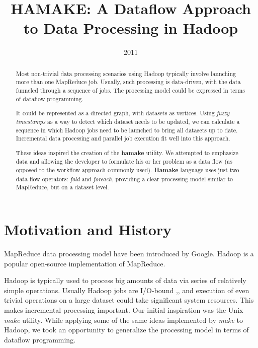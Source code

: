 \documentclass[10pt,conference,letterpaper]{IEEEtran}
\title{HAMAKE: A Dataflow Approach to Data Processing in Hadoop}
\author{\IEEEauthorblockN{Vadim Zaliva}
\IEEEauthorblockA{Codeminders\\
Email: lord@crocodile.org} \and \IEEEauthorblockN{Vladimir Orlov}
\IEEEauthorblockA{Codeminders\\
Email: vorl@codeminders.com}}
\date{2011}
\begin{document}
\lstset{language=XML,basicstyle=\tiny,markfirstintag=true,numbers=left,numbersep=1pt}

\maketitle

\begin{abstract}
  Most non-trivial data processing scenarios using Hadoop typically
  involve launching more than one MapReduce job. Usually, such
  processing is data-driven, with the data funneled through a sequence
  of jobs. The processing model could be expressed in terms of
  dataflow programming.
  
  It could be represented as a directed graph, with datasets as
  vertices. Using \textit{fuzzy timestamps} as a way to detect which
  dataset needs to be updated, we can calculate a sequence in which
  Hadoop jobs need to be launched to bring all datasets up to
  date. Incremental data processing and parallel job execution fit
  well into this approach.

  These ideas inspired the creation of the \textbf{hamake} utility. We
  attempted to emphasize data and allowing the developer to formulate
  his or her problem as a data flow (as opposed to the workflow approach
  commonly used). \textbf{Hamake} language uses just two data flow
  operators: \emph{fold} and \emph{foreach}, providing a clear
  processing model similar to MapReduce, but on a dataset level.
\end{abstract}

\section{Motivation and History}

MapReduce data processing model have been introduced by
Google\cite{dean2008map}. Hadoop\cite{bialecki2005hadoop} is a popular
open-source implementation of MapReduce.

Hadoop is typically used to process big amounts of data via series of
relatively simple operations. Usually Hadoop jobs are I/O-bound
\cite{hadoopattwitter},\cite{hs2010hadoopbench}, and execution of even
trivial operations on a large dataset could take significant system
resources. This makes incremental processing important. Our initial
inspiration was the Unix \emph{make} utility. While applying some of the same ideas implemented by \emph{make}
to Hadoop, we took an opportunity to generalize the
processing model in terms of dataflow programming.
\end{document}
